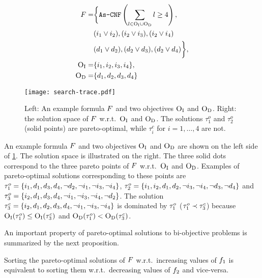 \begin{figure}
  \begin{minipage}{0.377\textwidth}
    \small
    \begin{align*}
      F = &\bigg\{ \texttt{As-CNF}\left(\sum_ {l \in \textsc{O}_{\text{I}} \cup \textsc{O}_{\text{D}}} l \geq 4 \right), \\
        &(i_1 \lor i_2), (i_2 \lor i_3), (i_2 \lor i_4) \\
        &(d_1 \lor d_2), (d_2 \lor d_3), (d_2 \lor d_4) \bigg\}, \\
      \textsc{O}_{\text{I}} =&\{ i_1, i_2, i_3, i_4 \}, \\
      \textsc{O}_{\text{D}} =&\{ d_1, d_2, d_3, d_4 \} 
    \end{align*}
  \end{minipage}
  \;
  \begin{minipage}{0.605\textwidth}
    \texttt{[image: search-trace.pdf]}
  \end{minipage}
  \caption{Left: An example formula $F$ and two objectives $\textsc{O}_{\text{I}}$ and $\textsc{O}_{\text{D}}$.
    Right: the solution space of $F$ w.r.t.\ $\textsc{O}_{\text{I}}$ and $\textsc{O}_{\text{D}}$.
    The solutions $\tau^o_1$ and $\tau^o_2$ (solid points) are pareto-optimal, while $\tau^c_i$ for $i=1,\ldots,4$ are not.\label{fig:search-trace}}
\end{figure}
\begin{example}\label{ex:main}
  An example formula $F$ and two objectives $\textsc{O}_{\text{I}}$ and $\textsc{O}_{\text{D}}$ are shown on the left side of \cref{fig:search-trace}. 
  The solution space is illustrated on the right.
  The three solid dots correspond to the three pareto points of $F$ w.r.t.\ $\textsc{O}_{\text{I}}$ and $\textsc{O}_{\text{D}}$. 
  Examples of pareto-optimal solutions corresponding to these points are $\tau^o_1 = {\{i_1,\allowbreak d_1,\allowbreak d_3,\allowbreak d_4,\allowbreak \lnot d_2,\allowbreak \lnot i_1,\allowbreak \lnot i_3,\allowbreak \lnot i_4\}}$, $\tau^o_2 = {\{i_1,\allowbreak i_2,\allowbreak d_1,\allowbreak d_2,\allowbreak \lnot i_3,\allowbreak \lnot i_4,\allowbreak \lnot d_3,\allowbreak \lnot d_4\}}$ and $\tau^o_3 = {\{i_2,\allowbreak d_1,\allowbreak d_3,\allowbreak d_4,\allowbreak \lnot i_1,\allowbreak \lnot i_3,\allowbreak \lnot i_4,\allowbreak \lnot d_2\}}$.
  The solution $\tau^c_3 = {\{i_2,\allowbreak d_1,\allowbreak d_2,\allowbreak d_3,\allowbreak d_4,\allowbreak \lnot i_1,\allowbreak \lnot i_3,\allowbreak \lnot i_4\}}$ is dominated by $\tau^o_1$ ($\tau^o_1 \prec \tau^c_3$) because $\textsc{O}_{\text{I}}(\tau^o_1) \leq \textsc{O}_{\text{I}}(\tau^c_3)$ and $\textsc{O}_{\text{D}}(\tau^o_1) < \textsc{O}_{\text{D}}(\tau^c_3)$.
\end{example}

An important property of pareto-optimal solutions to bi-objective problems is summarized by the next proposition.
\begin{proposition} \label{prop:biobjective}
  Sorting the pareto-optimal solutions of $F$ w.r.t.\ increasing values of $f_1$ is equivalent to sorting them w.r.t.\ decreasing values of $f_2$ and vice-versa.
\end{proposition}

